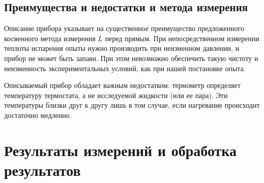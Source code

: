 \documentclass[a4paper,12pt]{article}
\theoremstyle{plain} %
\theoremstyle{definition} %
\theoremstyle{remark} %
\begin{document}
\subsection{Преимущества и недостатки и  метода измерения}
	Описание прибора указывает на существенное преимущество предложенного косвенного метода измерения $L$ перед прямым. При непосредственном измерении теплоты испарения опыты нужно производить при неизменном давлении, и прибор не может быть запаян. При этом невозможно обеспечить такую чистоту и неизменность экспериментальных условий, как при нашей постановке опыта.
	
	Описываемый прибор обладает важным недостатком: термометр определяет температуру термостата, а не исследуемой жидкости (или
ее пара). Эти температуры близки друг к другу лишь в том случае, если нагревание происходит достаточно медленно.
	\section{Результаты измерений и обработка результатов}
\end{document}

